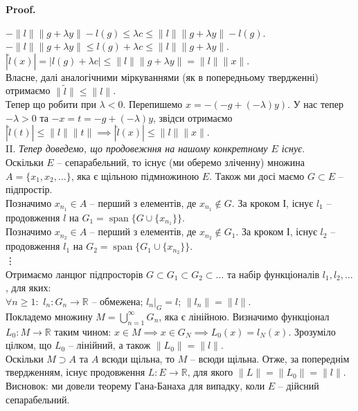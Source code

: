 \documentclass[a4paper, 10pt]{article}
\makeatletter
\theoremstyle{theoremdd}
\theoremstyle{theoremdd}
\theoremstyle{theoremdd}
\theoremstyle{theoremdd}
\theoremstyle{theoremdd}
\theoremstyle{theoremdd}
\theoremstyle{theoremdd}
\theoremstyle{theoremdd}
\renewenvironment{proof}[1][Proof.\\]{\par
\pushQED{\hfill \qed}%
\normalfont \topsep6\p@\@plus6\p@\relax
\trivlist
\item\relax
{\bfseries
#1\@addpunct{.}}\hspace\labelsep\ignorespaces
}{%
\popQED\endtrivlist\@endpefalse
}
\DeclareMathOperator{\linspan}{span}
\makeatother
\begin{document}
\begin{proof}
$-\|l\| \|g+\lambda y \| - l(g) \leq \lambda c \leq \|l\| \|g + \lambda y \| - l(g)$.\\
$-\|l\| \|g+\lambda y\| \leq l(g) + \lambda c \leq \|l\| \|g+\lambda y\|$.\\
$|\tilde{l}(x)| = |l(g) + \lambda c| \leq \|l\| \|g + \lambda y\| = \|l\| \|x\|$.\\
Власне, далі аналогічними міркуваннями (як в попередньому твердженні) отримаємо $\|\tilde{l}\| \leq \|l\|$.\\
Тепер що робити при $\lambda < 0$. Перепишемо $x = -(-g + (-\lambda)y)$. У нас тепер $-\lambda > 0$ та $-x = t = -g + (-\lambda)y$, звідси отримаємо\\
$|\tilde{l}(t)| \leq \|l\| \|t\| \implies |\tilde{l}(x)| \leq \|l\| \|x\|$.
\bigskip \\
II. \textit{Тепер доведемо, що продовежння на нашому конкретному $E$ існує}.\\
Оскільки $E$ -- сепарабельний, то існує (ми оберемо зліченну) множина $A = \{x_1,x_2,\dots\}$, яка є щільною підмножиною $E$. Також ми досі маємо $G \subset E$ -- підпростір.\\
Позначимо $x_{n_1} \in A$ -- перший з елементів, де $x_{n_1} \notin G$. За кроком І, існує $l_1$ -- продовження $l$ на $G_1 = \linspan\{G \cup \{x_{n_1}\}\}$.\\
Позначимо $x_{n_2} \in A$ -- перший з елементів, де $x_{n_2} \notin G_1$. За кроком І, існує $l_2$ -- продовження $l_1$ на $G_2 = \linspan\{G_1 \cup \{x_{n_2}\}\}$.\\
\vdots \\
Отримаємо ланцюг підпросторів $G \subset G_1 \subset G_2 \subset \dots$ та набір функціоналів $l_1,l_2,\dots$, для яких:\\
$\forall n \geq 1:$ \qquad $l_n \colon G_n \to \mathbb{R}$ -- обмежена; \qquad $l_n|_G = l$; \qquad $\|l_n\| = \|l\|$.\\
Покладемо множину $M = \displaystyle\bigcup_{n=1}^\infty G_n$, яка є лінійною. Визначимо функціонал $L_0 \colon M \to \mathbb{R}$ таким чином: $x \in M \implies x \in G_N \implies L_0(x) = l_N(x)$. Зрозуміло цілком, що $L_0$ -- лінійний, а також $\|L_0\| = \|l\|$.\\
Оскільки $M \supset A$ та $A$ всюди щільна, то $M$ -- всюди щільна. Отже, за попереднім твердженням, існує продовження $L \colon E \to \mathbb{R}$, для якого $\|L\| = \|L_0\| = \|l\|$.\\
Висновок: ми довели теорему Гана-Банаха для випадку, коли $E$ -- дійсний сепарабельний.
\bigskip \\

\end{proof}
\end{document}
